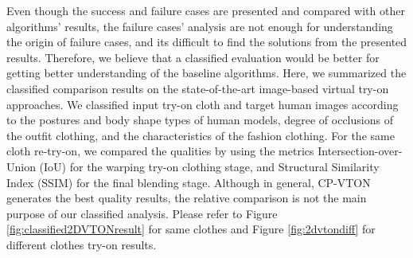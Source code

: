 Even though the success and failure cases are presented and compared with other algorithms' results, the failure cases' analysis are not enough for understanding the origin of failure cases, and its difficult to find the solutions from the presented results. Therefore, we believe that a classified evaluation would be better for getting better understanding of the baseline algorithms. Here, we summarized the classified comparison results on the state-of-the-art image-based virtual try-on approaches. We classified input try-on cloth and target human images according to the postures and body shape types of human models, degree of occlusions of the outfit clothing, and the characteristics of the fashion clothing. For the same cloth re-try-on, we compared the qualities by using the metrics Intersection-over-Union (IoU) for the warping try-on clothing stage, and Structural Similarity Index (SSIM) for the final blending stage. Although in general, CP-VTON\cite{Wang2018TowardCI} generates the best quality results, the relative comparison is not the main purpose of our classified analysis. Please refer to Figure \ref{fig:classified2DVTONresult} for same clothes and Figure \ref{fig:2dvtondiff} for different clothes try-on results.




